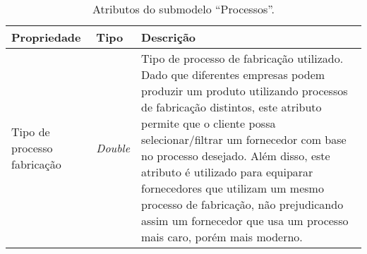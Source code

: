 \begin{longtable}{p{} p{} p{}}
	\caption{Atributos do submodelo ``Processos''.}                                                                                                                                                                                                                                                                                                                                                                                                                                                                                                                                                                                                                   \\

	\hline
	\textbf{Propriedade}
	 & \textbf{Tipo}
	 & \textbf{Descrição}                                                                                                                                                                                                                                                                                                                                                                                                                                                                                                                                                                                                                                             \\



	\hline
	Tipo de processo fabricação
	 & \textit{Double}
	 & Tipo de processo de fabricação utilizado. Dado que diferentes empresas podem produzir um produto utilizando processos de fabricação distintos, este atributo permite que o cliente possa selecionar/filtrar um fornecedor com base no processo desejado. Além disso, este atributo é utilizado para equiparar fornecedores que utilizam um mesmo processo de fabricação, não prejudicando assim um fornecedor que usa um processo mais caro, porém mais moderno.                                                                                                                                                                                               \\


\end{longtable}
